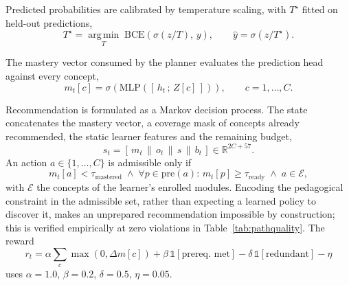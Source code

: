 Predicted probabilities are calibrated by temperature scaling, with $T^\star$ fitted
on held-out predictions,
%
\begin{equation}
T^\star = \operatorname*{arg\,min}_{T} \;
\mathrm{BCE}\!\left(\sigma(z/T),\, y\right),
\qquad
\hat{y} = \sigma\!\left(z / T^\star\right).
\label{eq:temperature}
\end{equation}

The mastery vector consumed by the planner evaluates the prediction head against every
concept,
%
\begin{equation}
m_t[c] = \sigma\!\left(\mathrm{MLP}\!\left(\left[\,h_t\,;\,Z[c]\,\right]\right)\right),
\qquad c = 1,\dots,C.
\label{eq:mastery}
\end{equation}

Recommendation is formulated as a Markov decision process. The state concatenates the
mastery vector, a coverage mask of concepts already recommended, the static learner
features and the remaining budget,
%
\begin{equation}
s_t = \left[\,m_t \,\|\, o_t \,\|\, s \,\|\, b_t\,\right] \in \mathbb{R}^{2C + 57}.
\label{eq:state}
\end{equation}
%
An action $a \in \{1,\dots,C\}$ is admissible only if
%
\begin{equation}
m_t[a] < \tau_{\text{mastered}}
\;\wedge\;
\forall p \in \mathrm{pre}(a):\, m_t[p] \geq \tau_{\text{ready}}
\;\wedge\;
a \in \mathcal{E},
\label{eq:mask}
\end{equation}
%
with $\mathcal{E}$ the concepts of the learner's enrolled modules. Encoding the
pedagogical constraint in the admissible set, rather than expecting a learned policy
to discover it, makes an unprepared recommendation impossible by construction; this is
verified empirically at zero violations in Table~\ref{tab:pathquality}. The reward
%
\begin{equation}
r_t = \alpha \sum_{c} \max\!\left(0, \Delta m[c]\right)
+ \beta\,\mathbb{1}[\text{prereq.\ met}]
- \delta\,\mathbb{1}[\text{redundant}]
- \eta
\label{eq:reward}
\end{equation}
%
uses $\alpha = 1.0$, $\beta = 0.2$, $\delta = 0.5$, $\eta = 0.05$.

